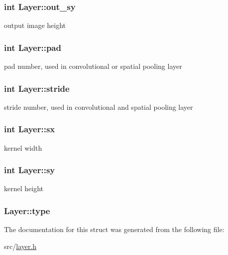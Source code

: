 \subsubsection[{out\+\_\+sy}]{\setlength{\rightskip}{0pt plus 5cm}int Layer\+::out\+\_\+sy}\hypertarget{structLayer_aec5ede8f8a6236e9c64bce289e1a63c3}{}\label{structLayer_aec5ede8f8a6236e9c64bce289e1a63c3}
output image height 
\subsubsection[{pad}]{\setlength{\rightskip}{0pt plus 5cm}int Layer\+::pad}\hypertarget{structLayer_a188060ee891fc16630afb232b86d4d39}{}\label{structLayer_a188060ee891fc16630afb232b86d4d39}
pad number, used in convolutional or spatial pooling layer 
\subsubsection[{stride}]{\setlength{\rightskip}{0pt plus 5cm}int Layer\+::stride}\hypertarget{structLayer_a2a7d5301da0ed82b8d68b3400856ee00}{}\label{structLayer_a2a7d5301da0ed82b8d68b3400856ee00}
stride number, used in convolutional and spatial pooling layer 
\subsubsection[{sx}]{\setlength{\rightskip}{0pt plus 5cm}int Layer\+::sx}\hypertarget{structLayer_a55c6cca33bde137cd47294fdb86c9ec3}{}\label{structLayer_a55c6cca33bde137cd47294fdb86c9ec3}
kernel width 
\subsubsection[{sy}]{\setlength{\rightskip}{0pt plus 5cm}int Layer\+::sy}\hypertarget{structLayer_a9852ef0522fef2248a0e8e0be2a5f7af}{}\label{structLayer_a9852ef0522fef2248a0e8e0be2a5f7af}
kernel height 
\subsubsection[{type}]{ Layer\+::type}\hypertarget{structLayer_a4179463433524fb5ef7624f85d80241b}{}\label{structLayer_a4179463433524fb5ef7624f85d80241b}


The documentation for this struct was generated from the following file\+:\begin{DoxyCompactItemize}
\item 
src/\hyperlink{layer_8h}{layer.\+h}\end{DoxyCompactItemize}
